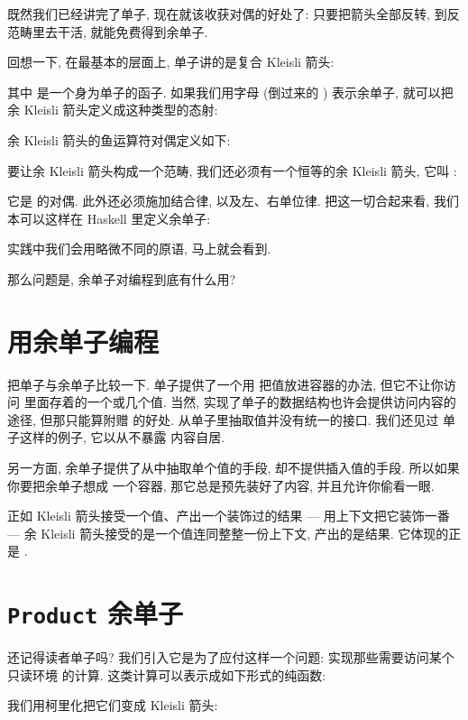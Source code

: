 
\lettrine[lhang=0.17]{既}{然我们已经讲完了单子}, 现在就该收获对偶的好处了: 只要把箭头全部反转,
到反范畴里去干活, 就能免费得到余单子.

回想一下, 在最基本的层面上, 单子讲的是复合 Kleisli 箭头:

其中  是一个身为单子的函子. 如果我们用字母  (倒过来的 ) 表示余单子,
就可以把余 Kleisli 箭头定义成这种类型的态射:

余 Kleisli 箭头的鱼运算符对偶定义如下:

要让余 Kleisli 箭头构成一个范畴, 我们还必须有一个恒等的余 Kleisli 箭头, 它叫
:

它是  的对偶. 此外还必须施加结合律, 以及左、右单位律. 把这一切合起来看, 我们
本可以这样在 Haskell 里定义余单子:

实践中我们会用略微不同的原语, 马上就会看到.

那么问题是, 余单子对编程到底有什么用?

\section{用余单子编程}

把单子与余单子比较一下. 单子提供了一个用  把值放进容器的办法, 但它不让你访问
里面存着的一个或几个值. 当然, 实现了单子的数据结构也许会提供访问内容的途径, 但那只能算附赠
的好处. 从单子里抽取值并没有统一的接口. 我们还见过  单子这样的例子, 它以从不暴露
内容自居.

另一方面, 余单子提供了从中抽取单个值的手段, 却不提供插入值的手段. 所以如果你要把余单子想成
一个容器, 那它总是预先装好了内容, 并且允许你偷看一眼.

正如 Kleisli 箭头接受一个值、产出一个装饰过的结果 --- 用上下文把它装饰一番 --- 余 Kleisli
箭头接受的是一个值连同整整一份上下文, 产出的是结果. 它体现的正是 .

\section{\texttt{Product} 余单子}

还记得读者单子吗? 我们引入它是为了应付这样一个问题: 实现那些需要访问某个只读环境 
的计算. 这类计算可以表示成如下形式的纯函数:

我们用柯里化把它们变成 Kleisli 箭头:

